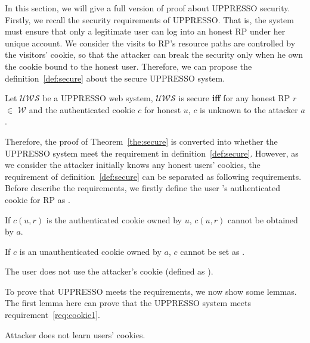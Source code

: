 \begin{appendices}
In this section, we will give a full version of proof about UPPRESSO security. Firstly, we recall the security requirements of UPPRESSO. That is, the system must ensure that only a legitimate user can log into an honest RP under her unique account. We consider the visits to RP's resource paths are controlled by the visitors' cookie, so that the attacker can break the security only when he own the cookie bound to the honest user. Therefore, we can propose the definition~\ref{def:secure} about the secure UPPRESSO system.
\begin{redef}
Let $\mathcal{UWS}$ be a UPPRESSO web system, $\mathcal{UWS}$ is secure \textbf{iff} for any honest RP $r$ $\in $ $\mathcal{W}$ and  the authenticated cookie $c$ for honest $u$,  $c$ is unknown to the attacker $a$. 
\end{redef}
Therefore, the proof of Theorem~\ref{the:secure} is converted into whether the UPPRESSO system meet the requirement in definition~\ref{def:secure}. However, as we consider the attacker initially knows any honest users' cookies, the requirement of definition~\ref{def:secure} can be separated as following requirements. Before describe the requirements, we firstly define the user 's authenticated cookie for RP  as .
\begin{req}
If $c(u,r)$ is the authenticated cookie owned by $u$, $c(u,r)$ cannot be obtained by $a$.
\label{req:cookie1}
\end{req}
\begin{req}
If $c$ is an unauthenticated cookie owned by $a$, $c$ cannot be set as . 
\label{req:cookie2}
\end{req}
\begin{req}
The user  does not use the attacker's cookie (defined as ). 
\label{req:cookie3}
\end{req}


To prove that UPPRESSO meets the requirements, we now show some lemmas. The first lemma here can prove that the UPPRESSO system meets requirement~\ref{req:cookie1}.
\begin{relemma}
Attacker does not learn users' cookies.
\label{rel:cookie}
\end{relemma}


\end{appendices}
